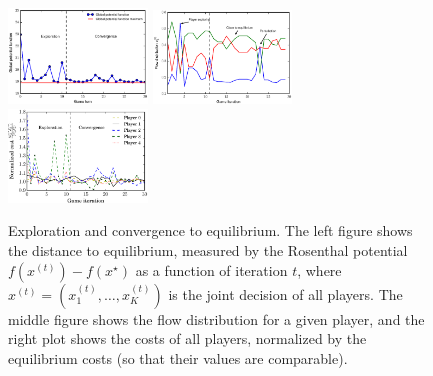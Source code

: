 \documentclass{sig-alternate-ipsn13}
\begin{document}



\begin{figure}
  \centering
  \includegraphics[width=0.33\textwidth]{images/global_potential_function}%
  \includegraphics[width=0.33\textwidth]{images/player_behavior}%
  \includegraphics[width=0.33\textwidth]{images/players_costs}%
  \caption{\footnotesize Exploration and convergence to equilibrium. The left figure shows the distance to equilibrium, measured by the Rosenthal potential $f(x^{(t)}) - f(x^\star)$ as a function of iteration $t$, where $x^{(t)} = (x_1^{(t)}, \dots, x_K^{(t)})$ is the joint decision of all players. The middle figure shows the flow distribution for a given player, and the right plot shows the costs of all players, normalized by the equilibrium costs (so that their values are comparable).}
  \label{fig:global_potential}
\end{figure}
\end{document}
